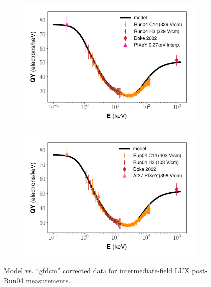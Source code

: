 \begin{figure}[!h]
\begin{subfigure}{0.5\linewidth}
\caption{}
\end{subfigure}%
\begin{subfigure}{0.5\linewidth}
\includegraphics[width=\linewidth]{Figures/Yields_fit_new/NEST_fit_329Vcm_new.pdf}
\caption{}
\end{subfigure}
\centering
\begin{subfigure}{0.5\linewidth}
\includegraphics[width=\linewidth]{Figures/Yields_fit_new/NEST_fit_403Vcm_new.pdf}
\caption{}
\end{subfigure}
\caption{Model vs. ``gfdcm'' corrected data for intermediate-field LUX post-Run04 measurements.}
\label{fig:betamod_midfield}
\end{figure}
